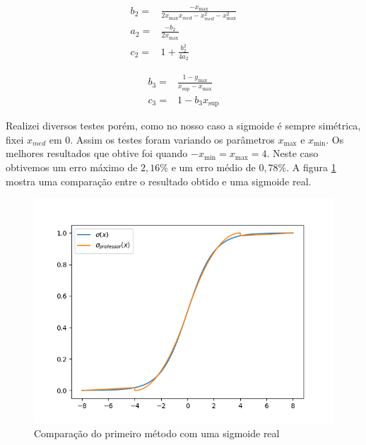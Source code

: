 \documentclass{article}
\begin{document}
\begin{equation}
\begin{split}
    b_2 =& \frac{-x_{\max}}{2x_{\max}x_{med} - x_{med}^2 - x_{\max}^2} \\
    a_2 =& \frac{-b_2}{2x_{\max}} \\
    c_2 =& 1 + \frac{b_2^2}{4a_2}
\end{split}
\end{equation}

\begin{equation}
\begin{split}
    b_3 =& \frac{1-y_{\max}}{x_{\sup}-x_{\max}} \\
    c_3 =& 1 - b_3x_{\sup}
\end{split}
\end{equation}

Realizei diversos testes porém, como no nosso caso a sigmoide é sempre simétrica, fixei $x_{med}$ em $0$. Assim os testes foram variando os parâmetros $x_{\max}$ e $x_{\min}$. Os melhores resultados que obtive foi quando $-x_{\min} = x_{\max} = 4$. Neste caso obtivemos um erro máximo de $2,16\%$ e um erro médio de $0,78\%$. A figura \ref{fig:prof} mostra uma comparação entre o resultado obtido e uma sigmoide real.

\begin{center}
\begin{figure}[h]
\label{fig:prof}
    \caption{Comparação do primeiro método com uma sigmoide real}
    \includegraphics[scale=.7]{sig_prof.png}
\end{figure}
\end{center}
\end{document}
